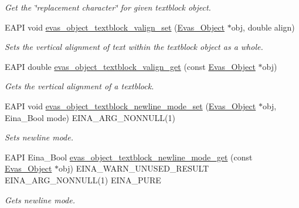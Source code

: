 \begin{DoxyCompactItemize}
\begin{DoxyCompactList}\small\item\em Get the \char`\"{}replacement character\char`\"{} for given textblock object. \item\end{DoxyCompactList}\item 
EAPI void \hyperlink{group__Evas__Object__Textblock_ga5f08b5b6222ed341574ec8167a86c9a0}{evas\_\-object\_\-textblock\_\-valign\_\-set} (\hyperlink{group__Evas__Object__Group_ga9e19e6dd1f517a0ba437c0114d3e7c97}{Evas\_\-Object} $\ast$obj, double align)
\begin{DoxyCompactList}\small\item\em Sets the vertical alignment of text within the textblock object as a whole. \item\end{DoxyCompactList}\item 
EAPI double \hyperlink{group__Evas__Object__Textblock_ga431ec30179fc3d7bcd98f508453e41bb}{evas\_\-object\_\-textblock\_\-valign\_\-get} (const \hyperlink{group__Evas__Object__Group_ga9e19e6dd1f517a0ba437c0114d3e7c97}{Evas\_\-Object} $\ast$obj)
\begin{DoxyCompactList}\small\item\em Gets the vertical alignment of a textblock. \item\end{DoxyCompactList}\item 
EAPI void \hyperlink{group__Evas__Object__Textblock_gae637041b07efe438e3539bb549a915e3}{evas\_\-object\_\-textblock\_\-newline\_\-mode\_\-set} (\hyperlink{group__Evas__Object__Group_ga9e19e6dd1f517a0ba437c0114d3e7c97}{Evas\_\-Object} $\ast$obj, Eina\_\-Bool mode) EINA\_\-ARG\_\-NONNULL(1)
\begin{DoxyCompactList}\small\item\em Sets newline mode. \item\end{DoxyCompactList}\item 
EAPI Eina\_\-Bool \hyperlink{group__Evas__Object__Textblock_ga0832ab9fd2820efee68bec6d1d80e427}{evas\_\-object\_\-textblock\_\-newline\_\-mode\_\-get} (const \hyperlink{group__Evas__Object__Group_ga9e19e6dd1f517a0ba437c0114d3e7c97}{Evas\_\-Object} $\ast$obj) EINA\_\-WARN\_\-UNUSED\_\-RESULT EINA\_\-ARG\_\-NONNULL(1) EINA\_\-PURE
\begin{DoxyCompactList}\small\item\em Gets newline mode. \item\end{DoxyCompactList}\item 

\end{DoxyCompactItemize}
